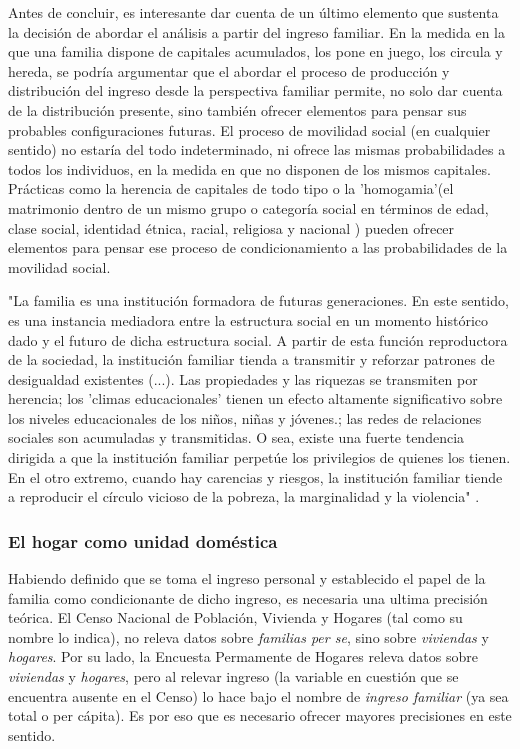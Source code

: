 Antes de concluir, es interesante dar cuenta de un último elemento que sustenta la decisión de abordar el análisis a partir del ingreso familiar. En la medida en la que una familia dispone de capitales acumulados, los pone en juego, los circula y hereda, se podría argumentar que el abordar el proceso de producción y distribución del ingreso desde la perspectiva familiar permite, no solo dar cuenta de la distribución presente, sino también ofrecer elementos para pensar sus probables configuraciones futuras. El proceso de movilidad social (en cualquier sentido) no estaría del todo indeterminado, ni ofrece las mismas probabilidades a todos los individuos, en la medida en que no disponen de los mismos capitales. Prácticas como la herencia de capitales de todo tipo o la 'homogamia'(el matrimonio dentro de un mismo grupo o categoría social en términos de edad, clase social, identidad étnica, racial, religiosa y nacional \cite[p.~31]{jelin}) pueden ofrecer elementos para pensar ese proceso de condicionamiento a las probabilidades de la movilidad social.
	
"La familia es una institución formadora de futuras generaciones. En este sentido, es una instancia mediadora entre la estructura social en un momento histórico dado y el futuro de dicha estructura social. A partir de esta función reproductora de la sociedad, la institución familiar tienda a transmitir y reforzar patrones de desigualdad existentes (...). Las propiedades y las riquezas se transmiten por herencia; los 'climas educacionales' tienen un efecto altamente significativo sobre los niveles educacionales de los niños, niñas y jóvenes.; las redes de relaciones sociales son acumuladas y transmitidas. O sea, existe una fuerte tendencia dirigida a que la institución familiar perpetúe los privilegios de quienes los tienen. En el otro extremo, cuando hay carencias y riesgos, la institución familiar tiende a reproducir el círculo vicioso de la pobreza, la marginalidad y la violencia" \cite[p.~197]{jelin}.

\subsubsection{El hogar como unidad doméstica}

Habiendo definido que se toma el ingreso personal y establecido el papel de la familia como condicionante de dicho ingreso, es necesaria una ultima precisión teórica. El Censo Nacional de Población, Vivienda y Hogares (tal como su nombre lo indica), no releva datos sobre \textit{familias per se}, sino sobre \textit{viviendas} y \textit{hogares}. Por su lado, la Encuesta Permamente de Hogares releva datos sobre \textit{viviendas} y \textit{hogares}, pero al relevar ingreso (la variable en cuestión que se encuentra ausente en el Censo) lo hace bajo el nombre de \textit{ingreso familiar} (ya sea total o per cápita). Es por eso que es necesario ofrecer mayores precisiones en este sentido. 
	
